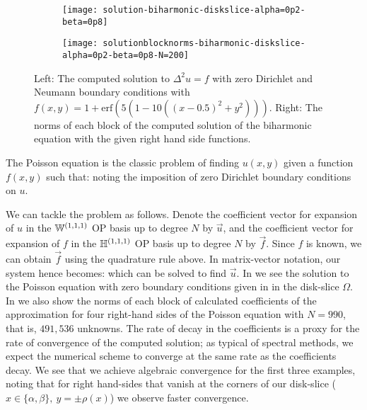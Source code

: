 \begin{figure}[t]
	\begin{subfigure}{0.3\textwidth}
	\centering
	\texttt{[image: solution-biharmonic-diskslice-alpha=0p2-beta=0p8]}
	\end{subfigure}
	\begin{subfigure}{0.5\textwidth}
	\texttt{[image: solutionblocknorms-biharmonic-diskslice-alpha=0p2-beta=0p8-N=200]}
	\centering
	\end{subfigure}
	\caption{Left: The computed solution to $\Delta^2 u = f$ with zero Dirichlet and Neumann boundary conditions with $f(x,y) = 1 + \text{erf}(5(1 - 10((x - 0.5)^2 + y^2)))$. Right: The norms of each block of the computed solution of the biharmonic equation with the given right hand side functions.}
	\centering
	\label{fig:ds:biharmonic}
\end{figure}

The Poisson equation is the classic problem of finding $u(x,y)$ given a function $f(x,y)$ such that:
noting the imposition of zero Dirichlet boundary conditions on $u$.

We can tackle the problem as follows. Denote the coefficient vector for expansion of $u$ in the ${\mathbb{W}^{(1,1,1)}}$ OP basis up to degree $N$ by $\vec{u}$, and the coefficient vector for expansion of $f$ in the ${\mathbb{H}^{(1,1,1)}}$ OP basis up to degree $N$ by $\vec{f}$. Since $f$ is known, we can obtain $\vec{f}$ using the quadrature rule above. In matrix-vector notation, our system hence becomes:
which can be solved to find $\vec{u}$.
In  we see the solution to the Poisson equation with zero boundary conditions given in  in the disk-slice $\Omega$. In  we also show the norms of each block of calculated coefficients of the approximation for four right-hand sides of the Poisson equation with $N = 990$, that is, $491,536$ unknowns. The rate of decay in the coefficients is a proxy for the rate of convergence of the computed solution; as typical of spectral methods, we expect the numerical scheme to converge at the same rate as the coefficients decay. We see that we achieve algebraic convergence for the first three examples, noting that for right hand-sides that vanish at the corners of our disk-slice ($x\in\{\alpha,\beta\}, \: y = \pm \rho(x)$) we observe faster convergence. 


